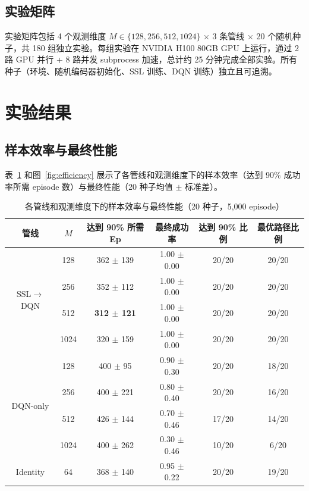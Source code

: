 \documentclass[11pt,a4paper]{ctexart}
\begin{document}
\subsection{实验矩阵}

实验矩阵包括 4 个观测维度 $M \in \{128, 256, 512, 1024\}$ × 3 条管线 × 20 个随机种子，共 180 组独立实验。每组实验在 NVIDIA H100 80GB GPU 上运行，通过 2 路 GPU 并行 + 8 路并发 subprocess 加速，总计约 25 分钟完成全部实验。所有种子（环境、随机编码器初始化、SSL 训练、DQN 训练）独立且可追溯。

\section{实验结果}

\subsection{样本效率与最终性能}

表~\ref{tab:results} 和图~\ref{fig:efficiency} 展示了各管线和观测维度下的样本效率（达到 90\% 成功率所需 episode 数）与最终性能（20 种子均值 $\pm$ 标准差）。

\begin{table}[htbp]
\centering
\caption{各管线和观测维度下的样本效率与最终性能（20 种子，5,000 episode）}
\label{tab:results}
\begin{tabular}{cccccc}
\toprule
管线 & $M$ & 达到 90\% 所需 Ep & 最终成功率 & 达到 90\% 比例 & 最优路径比例 \\
\midrule
\multirow{4}{*}{SSL$\to$DQN}
& 128 & 362 $\pm$ 139 & 1.00 $\pm$ 0.00 & 20/20 & 20/20 \\
& 256 & 352 $\pm$ 112 & 1.00 $\pm$ 0.00 & 20/20 & 20/20 \\
& 512 & \textbf{312 $\pm$ 121} & 1.00 $\pm$ 0.00 & 20/20 & 20/20 \\
& 1024 & 320 $\pm$ 159 & 1.00 $\pm$ 0.00 & 20/20 & 20/20 \\
\midrule
\multirow{4}{*}{DQN-only}
& 128 & 400 $\pm$ 95 & 0.90 $\pm$ 0.30 & 20/20 & 18/20 \\
& 256 & 400 $\pm$ 221 & 0.80 $\pm$ 0.40 & 20/20 & 16/20 \\
& 512 & 426 $\pm$ 144 & 0.70 $\pm$ 0.46 & 17/20 & 14/20 \\
& 1024 & 400 $\pm$ 262 & 0.30 $\pm$ 0.46 & 10/20 & 6/20 \\
\midrule
Identity & 64 & 368 $\pm$ 140 & 0.95 $\pm$ 0.22 & 20/20 & 19/20 \\
\bottomrule
\end{tabular}
\end{table}
\end{document}
